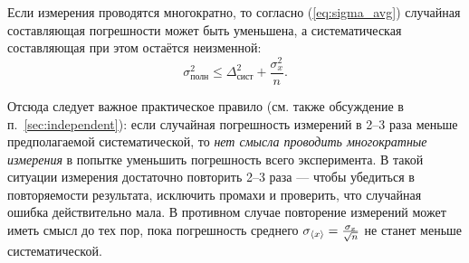 
Если измерения проводятся многократно, то согласно (\ref{eq:sigma_avg})
случайная составляющая погрешности может быть уменьшена, а систематическая
составляющая при этом остаётся неизменной:
\[
\sigma_{\text{полн}}^{2}\le\Delta_{\text{сист}}^{2}+\frac{\sigma_{x}^{2}}{n}.
\]

Отсюда следует важное практическое правило
(см. также обсуждение в п.~\ref{sec:independent}): если случайная погрешность измерений
в 2--3 раза меньше предполагаемой систематической, то
\emph{нет смысла проводить многократные измерения} в попытке уменьшить погрешность
всего эксперимента. В такой ситуации измерения достаточно повторить
2--3 раза --- чтобы убедиться в повторяемости результата, исключить промахи
и проверить, что случайная ошибка действительно мала.
В противном случае повторение измерений может иметь смысл до
тех пор, пока погрешность среднего
$\sigma_{\left<x\right>}=\frac{\sigma_{x}}{\sqrt{n}}$
не станет меньше систематической.



